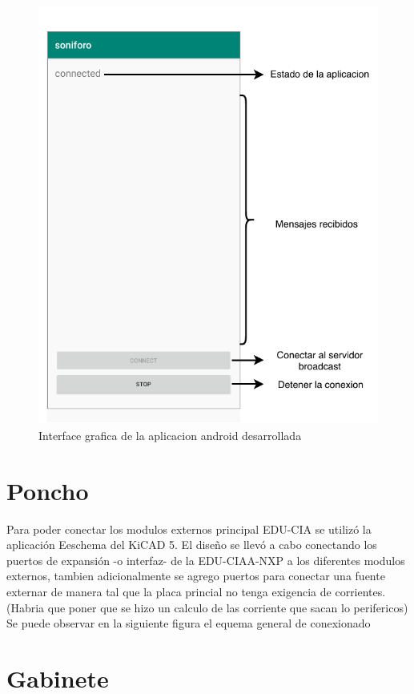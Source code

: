 \begin{figure}[h]
	\centering
	\includegraphics[scale=.5]{./Figures/androidApplication.pdf}
	\caption{Interface grafica de la aplicacion android desarrollada}
	\label{fig:androidApplication}
\end{figure}

\section{Poncho}
Para poder conectar los modulos externos principal EDU-CIA se utilizó la aplicación Eeschema del KiCAD 5. El diseño se llevó a cabo conectando los puertos de expansión -o interfaz- de la EDU-CIAA-NXP a los diferentes modulos externos, tambien adicionalmente se agrego puertos para conectar una fuente externar de manera tal que la placa princial  no tenga exigencia de corrientes. 
(Habria que poner que se hizo un calculo de las corriente que sacan lo perifericos)
Se puede observar en la siguiente figura el equema general de conexionado

\section{Gabinete}